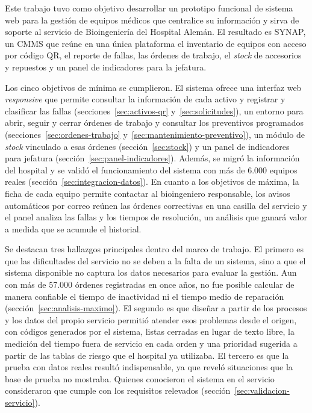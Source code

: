 \documentclass[10pt]{article}
\begin{document}
Este trabajo tuvo como objetivo desarrollar un prototipo funcional de sistema web para la gestión de equipos médicos que centralice su información y sirva de soporte al servicio de Bioingeniería del Hospital Alemán. El resultado es SYNAP, un CMMS que reúne en una única plataforma el inventario de equipos con acceso por código QR, el reporte de fallas, las órdenes de trabajo, el \textit{stock} de accesorios y repuestos y un panel de indicadores para la jefatura.

Los cinco objetivos de mínima se cumplieron. El sistema ofrece una interfaz web \textit{responsive} que permite consultar la información de cada activo y registrar y clasificar las fallas (secciones~\ref{sec:activos-qr} y~\ref{sec:solicitudes}), un entorno para abrir, seguir y cerrar órdenes de trabajo y consultar los preventivos programados (secciones~\ref{sec:ordenes-trabajo} y~\ref{sec:mantenimiento-preventivo}), un módulo de \textit{stock} vinculado a esas órdenes (sección~\ref{sec:stock}) y un panel de indicadores para jefatura (sección~\ref{sec:panel-indicadores}). Además, se migró la información del hospital y se validó el funcionamiento del sistema con más de 6.000 equipos reales (sección~\ref{sec:integracion-datos}). En cuanto a los objetivos de máxima, la ficha de cada equipo permite contactar al bioingeniero responsable, los avisos automáticos por correo reúnen las órdenes correctivas en una casilla del servicio y el panel analiza las fallas y los tiempos de resolución, un análisis que ganará valor a medida que se acumule el historial.

Se destacan tres hallazgos principales dentro del marco de trabajo. El primero es que las dificultades del servicio no se deben a la falta de un sistema, sino a que el sistema disponible no captura los datos necesarios para evaluar la gestión. Aun con más de 57.000 órdenes registradas en once años, no fue posible calcular de manera confiable el tiempo de inactividad ni el tiempo medio de reparación (sección~\ref{sec:analisis-maximo}). El segundo es que diseñar a partir de los procesos y los datos del propio servicio permitió atender esos problemas desde el origen, con códigos generados por el sistema, listas cerradas en lugar de texto libre, la medición del tiempo fuera de servicio en cada orden y una prioridad sugerida a partir de las tablas de riesgo que el hospital ya utilizaba. El tercero es que la prueba con datos reales resultó indispensable, ya que reveló situaciones que la base de prueba no mostraba. Quienes conocieron el sistema en el servicio consideraron que cumple con los requisitos relevados (sección~\ref{sec:validacion-servicio}).
\end{document}
